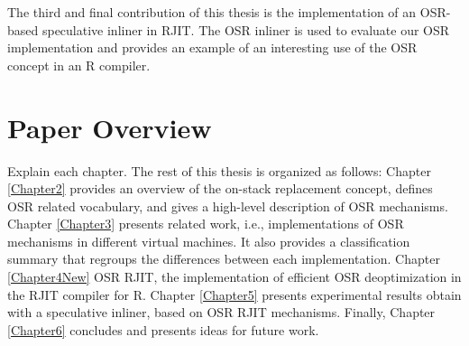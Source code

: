 The third and final contribution of this thesis is the implementation of an OSR-based speculative inliner in RJIT.
The OSR inliner is used to evaluate our OSR implementation and provides an example of an interesting use of the OSR concept in an R compiler.\\

\section{Paper Overview}
Explain each chapter.
The rest of this thesis is organized as follows: Chapter \ref{Chapter2} provides an overview of the on-stack replacement concept, defines OSR related vocabulary, and gives a high-level description of OSR mechanisms.
Chapter \ref{Chapter3} presents related work, i.e., implementations of OSR mechanisms in different virtual machines. It also provides a classification summary that regroups the differences between each implementation.
Chapter \ref{Chapter4New} OSR RJIT, the implementation of efficient OSR deoptimization in the RJIT compiler for R.
Chapter \ref{Chapter5} presents experimental results obtain with a speculative inliner, based on OSR RJIT mechanisms.
Finally, Chapter \ref{Chapter6} concludes and presents ideas for future work.\\ 





